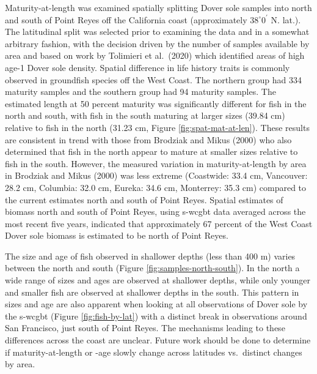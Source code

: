 \documentclass[11pt,
  english,
  a4paper,
]{article}
\begin{document}
\leavevmode\tagmcend\tagstructend\par


Maturity-at-length was examined spatially splitting Dover sole samples into north and south of Point Reyes off the California coast (approximately {\(38^\circ 0^\prime\)\leavevmode\tagmcend\tagstructend} N. lat.). The latitudinal split was selected prior to examining the data and in a somewhat arbitrary fashion, with the decision driven by the number of samples available by area and based on work by Tolimieri et al.~{(2020)\leavevmode\tagmcend\tagstructend} which identified areas of high age-1 Dover sole density. Spatial difference in life history traits is commonly observed in groundfish species off the West Coast. The northern group had 334 maturity samples and the southern group had 94 maturity samples. The estimated length at 50 percent maturity was significantly different for fish in the north and south, with fish in the south maturing at larger sizes (39.84 cm) relative to fish in the north (31.23 cm, Figure \ref{fig:spat-mat-at-len}). These results are consistent in trend with those from Brodziak and Mikus {(2000)\leavevmode\tagmcend\tagstructend} who also determined that fish in the north appear to mature at smaller sizes relative to fish in the south. However, the measured variation in maturity-at-length by area in Brodziak and Mikus {(2000)\leavevmode\tagmcend\tagstructend} was less extreme (Coastwide: 33.4 cm, Vancouver: 28.2 cm, Columbia: 32.0 cm, Eureka: 34.6 cm, Monterrey: 35.3 cm) compared to the current estimates north and south of Point Reyes. Spatial estimates of biomass north and south of Point Reyes, using \gls{s-wcgbt} data averaged across the most recent five years, indicated that approximately 67 percent of the West Coast Dover sole biomass is estimated to be north of Point Reyes.

\leavevmode\tagmcend\tagstructend\par


The size and age of fish observed in shallower depths (less than 400 m) varies between the north and south (Figure \ref{fig:samples-north-south}). In the north a wide range of sizes and ages are observed at shallower depths, while only younger and smaller fish are observed at shallower depths in the south. This pattern in sizes and age are also apparent when looking at all observations of Dover sole by the \gls{s-wcgbt} (Figure \ref{fig:fish-by-lat}) with a distinct break in observations around San Francisco, just south of Point Reyes. The mechanisms leading to these differences across the coast are unclear. Future work should be done to determine if maturity-at-length or -age slowly change across latitudes vs.~distinct changes by area.
\end{document}
